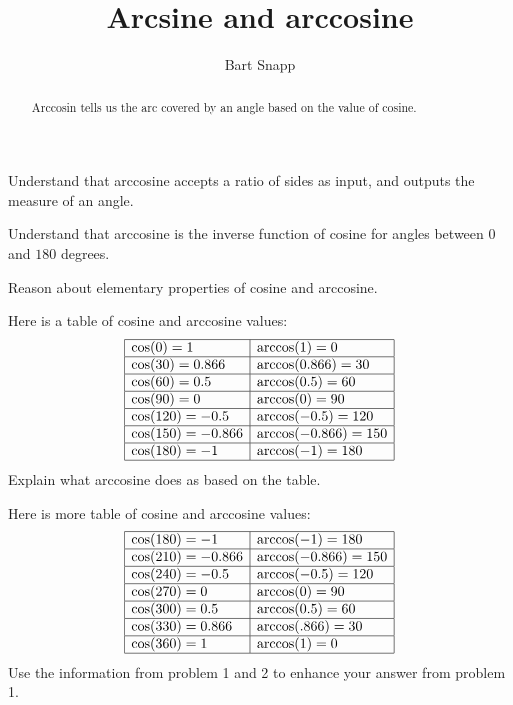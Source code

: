 \documentclass[noauthor,nooutcomes,12pt]{ximera}
\title{Arcsine and arccosine}
\author{Bart Snapp}
\begin{document}
\begin{abstract}
  Arccosin tells us the arc covered by an angle based on the value of
  cosine.
\end{abstract}
\maketitle

\begin{listOutcomes}
\item Understand that arccosine accepts a ratio of sides as input, and
  outputs the measure of an angle.
\item Understand that arccosine is the inverse function of cosine for
  angles between $0$ and $180$ degrees.
\item Reason about elementary properties of cosine and arccosine.
\end{listOutcomes}
\mynewpage




\begin{question}
  Here is a table of cosine and arccosine values:
  \[
  \begin{array}{|l|l|} \hline
    \cos(0)  = 1     & \arccos(1) = 0 \\ \hline
    \cos(30) = 0.866 & \arccos(0.866) = 30\\ \hline
    \cos(60) = 0.5 & \arccos(0.5) = 60\\ \hline
    \cos(90) = 0 & \arccos(0) = 90\\ \hline
    \cos(120) = -0.5 & \arccos(-0.5) = 120\\ \hline
    \cos(150) = -0.866 & \arccos(-0.866) = 150\\ \hline
    \cos(180) =-1 & \arccos(-1) = 180  \\\hline
  \end{array}
  \]
  Explain what arccosine does as based on the table.
  
  
\end{question}
\mynewpage



\begin{question}
  Here is more table of cosine and arccosine values:
  \[
  \begin{array}{|l|l|}
    \hline
    \cos(180) =-1      & \arccos(-1) = 180\\ \hline
    \cos(210) = -0.866 & \arccos(-0.866) = 150\\ \hline
    \cos(240) = -0.5   & \arccos(-0.5) = 120\\ \hline
    \cos(270) = 0      & \arccos(0) = 90\\ \hline
    \cos(300) = 0.5     & \arccos(0.5) = 60\\ \hline
    \cos(330) = 0.866   & \arccos(.866) = 30\\ \hline
    \cos(360)  = 1     & \arccos(1) = 0 \\    \hline
  \end{array}
  \]
  Use the information from problem 1 and 2 to enhance your answer from
  problem 1.
\end{question}
\mynewpage
\end{document}
